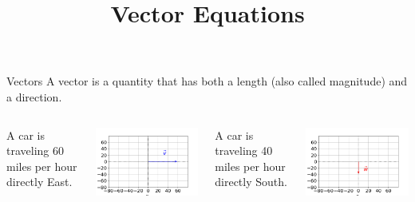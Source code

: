 \documentclass[xcolor=dvipsnames,aspectratio=169,t]{beamer}
\title{Vector Equations}
\begin{document}
\maketitle

\begin{frame}{Vectors}
  \bbox
  A \alert{vector} is a quantity that has both a length (also called magnitude) and a direction.
  \ebox

  \begin{columns}[T]

    \column{0.33\tw}

    A car is traveling 60 miles per hour directly East.

\includegraphics[width=0.9\tw]{images/fig-east.png}



    \column{0.33\tw}

    A car is traveling 40 miles per hour directly South.

\includegraphics[width=0.95\tw]{images/fig-south.png}


\end{columns}
\end{frame}
\end{document}
